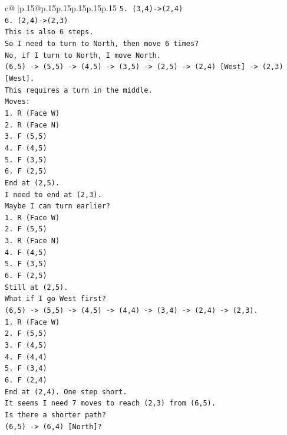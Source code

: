 \documentclass{article}
\begin{document}
{\begin{supertabular}{c@{$\;$}|p{.15\linewidth}@{}p{.15\linewidth}p{.15\linewidth}p{.15\linewidth}p{.15\linewidth}p{.15\linewidth}}
{{{\texttt{5. (3,4){-}>(2,4)} \\
\texttt{6. (2,4){-}>(2,3)} \\
\texttt{This is also 6 steps.} \\
\texttt{So I need to turn to North, then move 6 times?} \\
\texttt{No, if I turn to North, I move North.} \\
\texttt{(6,5) {-}> (5,5) {-}> (4,5) {-}> (3,5) {-}> (2,5) {-}> (2,4) {[}West{]} {-}> (2,3) {[}West{]}.} \\
\texttt{This requires a turn in the middle.} \\
\texttt{Moves:} \\
\texttt{1. R (Face W)} \\
\texttt{2. R (Face N)} \\
\texttt{3. F (5,5)} \\
\texttt{4. F (4,5)} \\
\texttt{5. F (3,5)} \\
\texttt{6. F (2,5)} \\
\texttt{End at (2,5).} \\
\texttt{I need to end at (2,3).} \\
\texttt{Maybe I can turn earlier?} \\
\texttt{1. R (Face W)} \\
\texttt{2. F (5,5)} \\
\texttt{3. R (Face N)} \\
\texttt{4. F (4,5)} \\
\texttt{5. F (3,5)} \\
\texttt{6. F (2,5)} \\
\texttt{Still at (2,5).} \\
\texttt{What if I go West first?} \\
\texttt{(6,5) {-}> (5,5) {-}> (4,5) {-}> (4,4) {-}> (3,4) {-}> (2,4) {-}> (2,3).} \\
\texttt{1. R (Face W)} \\
\texttt{2. F (5,5)} \\
\texttt{3. F (4,5)} \\
\texttt{4. F (4,4)} \\
\texttt{5. F (3,4)} \\
\texttt{6. F (2,4)} \\
\texttt{End at (2,4). One step short.} \\
\texttt{It seems I need 7 moves to reach (2,3) from (6,5).} \\
\texttt{Is there a shorter path?} \\
\texttt{(6,5) {-}> (6,4) {[}North{]}?} \\
}}}
\end{supertabular}}
\end{document}
